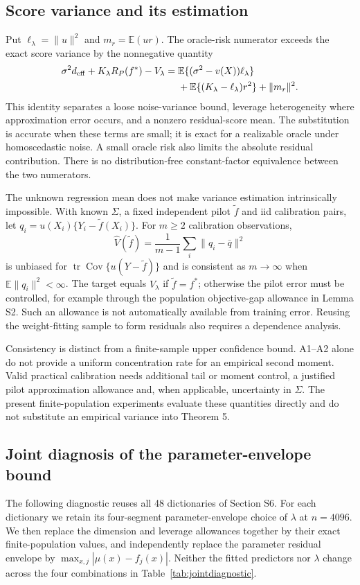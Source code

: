 \documentclass[pdflatex,sn-mathphys-ay]{sn-jnl}
\theoremstyle{remark}\newtheorem{remark}[theorem]{Remark}
\newcommand{\E}{\mathbb E}
\newcommand{\tr}{\operatorname{tr}}
\begin{document}
\subsection{Score variance and its estimation}
Put $\ell_\lambda=\|u\|^2$ and $m_r=\E(ur)$. The oracle-risk numerator exceeds the exact score variance by the nonnegative quantity
\begin{align*}
 \sigma^2d_{\rm eff}+K_\lambda R_P(f^*)-V_\lambda
 ={}&\E\{(\sigma^2-v(X))\ell_\lambda\}\\
 &+\E\{(K_\lambda-\ell_\lambda)r^2\}+\|m_r\|^2.
\end{align*}
This identity separates a loose noise-variance bound, leverage heterogeneity where approximation error occurs, and a nonzero residual-score mean. The substitution is accurate when these terms are small; it is exact for a realizable oracle under homoscedastic noise. A small oracle risk also limits the absolute residual contribution. There is no distribution-free constant-factor equivalence between the two numerators.

The unknown regression mean does not make variance estimation intrinsically impossible. With known $\Sigma$, a fixed independent pilot $\widetilde f$ and iid calibration pairs, let $q_i=u(X_i)\{Y_i-\widetilde f(X_i)\}$. For $m\geq2$ calibration observations,
\[
 \widehat V(\widetilde f)=\frac1{m-1}\sum_i\|q_i-\bar q\|^2
\]
is unbiased for $\tr\operatorname{Cov}\{u(Y-\widetilde f)\}$ and is consistent as $m\to\infty$ when $\E\|q_i\|^2<\infty$. The target equals $V_\lambda$ if $\widetilde f=f^*$; otherwise the pilot error must be controlled, for example through the population objective-gap allowance in Lemma S2. Such an allowance is not automatically available from training error. Reusing the weight-fitting sample to form residuals also requires a dependence analysis.

Consistency is distinct from a finite-sample upper confidence bound. A1--A2 alone do not provide a uniform concentration rate for an empirical second moment. Valid practical calibration needs additional tail or moment control, a justified pilot approximation allowance and, when applicable, uncertainty in $\Sigma$. The present finite-population experiments evaluate these quantities directly and do not substitute an empirical variance into Theorem 5.

\subsection{Joint diagnosis of the parameter-envelope bound}
The following diagnostic reuses all 48 dictionaries of Section S6. For each dictionary we retain its four-segment parameter-envelope choice of $\lambda$ at $n=4096$. We then replace the dimension and leverage allowances together by their exact finite-population values, and independently replace the parameter residual envelope by $\max_{x,j}|\mu(x)-f_j(x)|$. Neither the fitted predictors nor $\lambda$ change across the four combinations in Table~\ref{tab:jointdiagnostic}.
\end{document}
